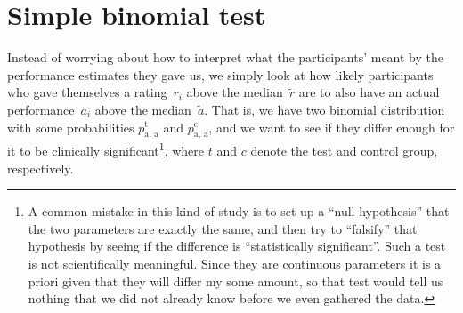 \documentclass[10pt, twoside,a4paper]{article}
\begin{document}
\newpage
\section{Simple binomial test}\label{sec_binomial}
Instead of worrying about how to interpret what the participants' meant by the performance estimates they gave us, we simply look at how likely participants who gave themselves a rating~$r_i$ above the median~$\tilde{r}$ are to also have an actual performance~$a_i$ above the median~$\tilde{a}$. That is, we have two binomial distribution with some probabilities $p^{\text{t}}_{\text{a, a}}$ and $p^{\text{c}}_{\text{a, a}}$, and we want to see if they differ enough for it to be clinically significant\footnote{A common mistake in this kind of study is to set up a ``null hypothesis'' that the two parameters are exactly the same, and then try to ``falsify'' that hypothesis by seeing if the difference is ``statistically significant''. Such a test is not scientifically meaningful. Since they are continuous parameters it is a priori given that they will differ my some amount, so that test would tell us nothing that we did not already know before we even gathered the data.}, where $t$ and $c$ denote the test and control group, respectively.
\end{document}
